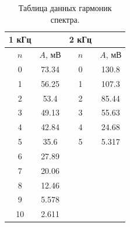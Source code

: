 \documentclass[a4paper, 14pt]{extarticle}%
\newcommand\ECaption[1]{%
     \captionsetup{font=footnotesize}%
     \caption{#1}}
\begin{document}
\begin{table}[h!]
\begin{center}
\begin{tabular}{|c|c|cc}
\hline
1 кГц                     &                               & \multicolumn{1}{c|}{2 кГц}                       & \multicolumn{1}{c|}{}                                \\ \hline
\rowcolor[HTML]{9698ED} 
$n$                       & $A$, мВ                       & \multicolumn{1}{c|}{\cellcolor[HTML]{9698ED}$n$} & \multicolumn{1}{c|}{\cellcolor[HTML]{9698ED}$A$, мВ} \\ \hline
0                         & 73.34                         & \multicolumn{1}{c|}{0}                           & \multicolumn{1}{c|}{130.8}                           \\ \hline
\rowcolor[HTML]{9698ED} 
1                         & 56.25                         & \multicolumn{1}{c|}{\cellcolor[HTML]{9698ED}1}   & \multicolumn{1}{c|}{\cellcolor[HTML]{9698ED}107.3}   \\ \hline
2                         & 53.4                          & \multicolumn{1}{c|}{2}                           & \multicolumn{1}{c|}{85.44}                           \\ \hline
\rowcolor[HTML]{9698ED} 
3                         & 49.13                         & \multicolumn{1}{c|}{\cellcolor[HTML]{9698ED}3}   & \multicolumn{1}{c|}{\cellcolor[HTML]{9698ED}55.63}   \\ \hline
4                         & 42.84                         & \multicolumn{1}{c|}{4}                           & \multicolumn{1}{c|}{24.68}                           \\ \hline
\rowcolor[HTML]{9698ED} 
5                         & 35.6                          & \multicolumn{1}{c|}{\cellcolor[HTML]{9698ED}5}   & \multicolumn{1}{c|}{\cellcolor[HTML]{9698ED}5.317}   \\ \hline
6                         & 27.89                         &                                                  &                                                      \\ \cline{1-2}
\cellcolor[HTML]{9698ED}7 & \cellcolor[HTML]{9698ED}20.06 &                                                  &                                                      \\ \cline{1-2}
8                         & 12.46                         &                                                  &                                                      \\ \cline{1-2}
\cellcolor[HTML]{9698ED}9 & \cellcolor[HTML]{9698ED}5.578 &                                                  &                                                      \\ \cline{1-2}
10                        & 2.611                         &                                                  &                                                      \\ \cline{1-2}
\end{tabular}
\ECaption{Таблица данных гармоник спектра.}
\end{center}
\end{table}
\end{document}
